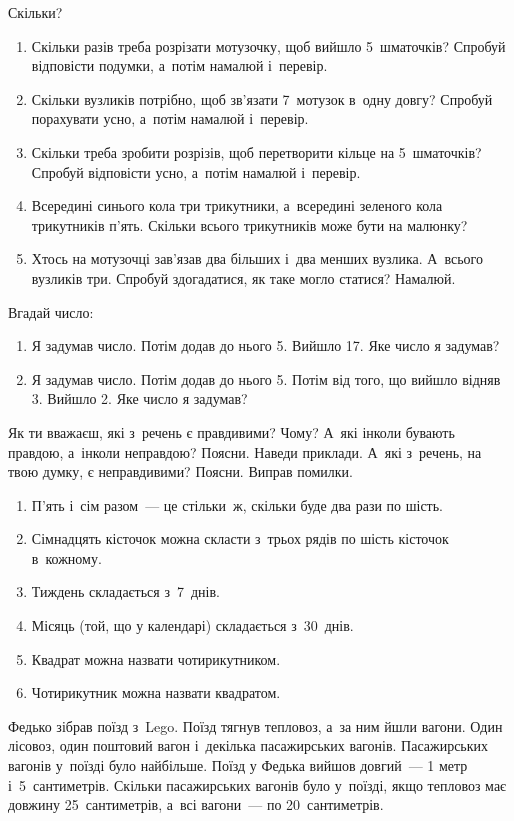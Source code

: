 \problem
Скільки?
\begin{enumerate}
  \item Скільки разів треба розрізати мотузочку, щоб вийшло 5~шматочків?
  Спробуй відповісти подумки, а~потім намалюй і~перевір.
  \item Скільки вузликів потрібно, щоб зв'язати 7~мотузок в~одну довгу?
  Спробуй порахувати усно, а~потім намалюй і~перевір.
  \item Скільки треба зробити розрізів, щоб перетворити кільце
  на 5~шматочків? Спробуй відповісти усно, а~потім намалюй і~перевір.
  \item Всередині синього кола три трикутники, а~всередині зеленого кола
  трикутників п'ять. Скільки всього трикутників може бути на малюнку?
  \item Хтось на мотузочці зав'язав два більших і~два менших вузлика.
  А~всього вузликів три. Спробуй здогадатися, як таке могло статися? Намалюй.
\end{enumerate}


\problem
Вгадай число:
\begin{enumerate}
  \item Я задумав число. Потім додав до нього 5. Вийшло 17.
  Яке число я задумав?
  \item Я задумав число. Потім додав до нього 5.
  Потім від того, що вийшло відняв 3. Вийшло 2.
  Яке число я задумав?
\end{enumerate}


\problem
Як ти вважаєш, які з~речень є правдивими? Чому?
А~які інколи бувають правдою, а~інколи неправдою? Поясни. Наведи приклади.
А~які з~речень, на твою думку, є неправдивими? Поясни. Виправ помилки.
\begin{enumerate}
  \item П'ять і~сім разом~--- це стільки~ж, скільки буде два рази по шість.
  \item Сімнадцять кісточок можна скласти з~трьох рядів
  по шість кісточок в~кожному.
  \item Тиждень складається з~7~днів.
  \item Місяць (той, що у календарі) складається з~30~днів.
  \item Квадрат можна назвати чотирикутником.
  \item Чотирикутник можна назвати квадратом.
\end{enumerate}


\problem
Федько зібрав поїзд з~Lego. Поїзд тягнув тепловоз, а~за ним йшли вагони.
Один лісовоз, один поштовий вагон і~декілька пасажирських вагонів.
Пасажирських вагонів у~поїзді було найбільше.
Поїзд у Федька вийшов довгий~--- 1 метр і~5~сантиметрів.
Скільки пасажирських вагонів було у~поїзді,
якщо тепловоз має довжину 25~сантиметрів, а~всі вагони~--- по 20~сантиметрів.


